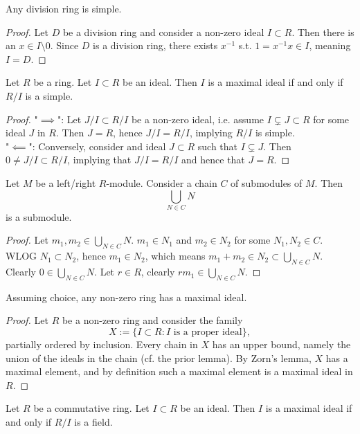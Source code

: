 \begin{lemma}\label{DivisionRingsAreSimple}
    Any division ring is simple.
\end{lemma}
\begin{proof}
    Let $D$ be a division ring and consider a non-zero ideal $I\subset R$. Then there is an $x\in I\setminus 0$. Since $D$ is a division ring, there exists $x^{-1}$ s.t. $1 = x^{-1}x\in I$, meaning $I = D$.
\end{proof}
\begin{lemma}\label{MaximalIdealIffQuotientRingSimple}
    Let $R$ be a ring. Let $I\subset R$ be an ideal. Then $I$ is a maximal ideal if and only if $R/I$ is a simple.
\end{lemma}
\begin{proof}
    "$\implies$": Let $J/I\subset R/I$ be a non-zero ideal, i.e. assume $I\subsetneq J\subset R$ for some ideal $J$ in $R$. Then $J = R$, hence $J/I= R/I$, implying $R/I$ is simple.\\
    "$\impliedby$": Conversely, consider and ideal $J\subset R$ such that $I\subsetneq J$. Then $0\neq J/I\subset R/I$, implying that $J/I = R/I$ and hence that $J=R$. 
\end{proof}
\begin{lemma}\label{UnionOverChainOfSubmodulesIsSubmodule}
    Let $M$ be a left/right $R$-module. Consider a chain $C$ of submodules of $M$. Then 
    $$\bigcup_{N\in C} N$$
    is a submodule.
\end{lemma}
\begin{proof}
    Let $m_1,m_2\in \bigcup_{N\in C} N$. $m_1\in N_1$ and $m_2\in N_2$ for some $N_1,N_2\in C$. WLOG $N_1\subset N_2$, hence $m_1\in N_2$, which means $m_1+m_2\in N_2 \subset \bigcup_{N\in C} N$. Clearly $0\in \bigcup_{N\in C} N$. Let $r\in R$, clearly $rm_1\in \bigcup_{N\in C} N$.
\end{proof} 
\begin{proposition}
    Assuming choice, any non-zero ring has a maximal ideal. 
\end{proposition}
\begin{proof}
    Let $R$ be a non-zero ring and consider the family 
    $$
        X := \{I\subset R : I \text{ is a proper ideal}\},
    $$
    partially ordered by inclusion. Every chain in $X$ has an upper bound, namely the union of the ideals in the chain (cf. the prior lemma). By Zorn's lemma, $X$ has a maximal element, and by definition such a maximal element is a maximal ideal in $R$. 
\end{proof}
\begin{proposition}\label{InCommutativeRingMaximalIdealIffQuotientRingField}
    Let $R$ be a commutative ring. Let $I\subset R$ be an ideal. Then $I$ is a maximal ideal if and only if $R/I$ is a field.
\end{proposition}
